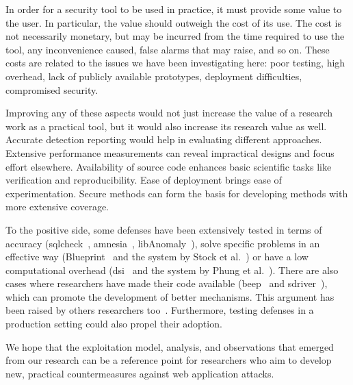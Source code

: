 \documentclass[10pt,journal,compsoc]{IEEEtran}
\begin{document}
In order for a security tool to be used in practice, it must provide
some value to the user. In particular, the value should outweigh the
cost of its use. The cost is not necessarily monetary, but may be
incurred from the time required to use the tool, any inconvenience
caused, false alarms that may raise, and so on. These costs are related to the
issues we have been investigating here: poor testing, high overhead,
lack of publicly available prototypes,
deployment difficulties, compromised security. 

Improving any of these aspects would not just increase the value of a 
research work as a practical tool, but it would also increase its
research value as well.
Accurate detection reporting would help in evaluating different
approaches. Extensive performance measurements can reveal impractical
designs and focus effort elsewhere. Availability of source code
enhances basic scientific tasks like verification and reproducibility. Ease of
deployment brings ease of experimentation. Secure methods can form the
basis for developing methods with more extensive coverage.

To the positive side, some defenses have been extensively tested in
terms of accuracy ({\sc sqlc}heck~\cite{SW06},
{\sc amnesia}~\cite{HO06}, libAnomaly~\cite{VMV05}),
solve specific problems in an effective way
(Blueprint~\cite{LV09} and the system by Stock et al.~\cite{SLMS14}) or
have a low computational overhead
({\sc dsi}~\cite{NSS06} and the system by Phung et al.~\cite{PSC09}).
There are also cases where
researchers have made their code available ({\sc beep}~\cite{TNH07}
and {\sc sd}river~\cite{MS09}),
which can promote the development of better
mechanisms. This argument has been raised by others
researchers too~\cite{SPWS13}.
Furthermore, testing defenses in a production
setting could also propel their adoption.

We hope that the exploitation model, analysis, and observations that
emerged from our research can be a reference point for researchers who
aim to develop new, practical countermeasures against web application
attacks.



\end{document}
